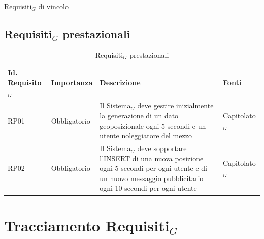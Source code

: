 \documentclass[10pt]{article}
\begin{document}
\begin{justify}
\begin{table}[H]
\caption{Requisiti$_G$ di vincolo}
\end{table}


\newpage
\subsection{Requisiti$_G$ prestazionali}

\begin{table}[H]
\centering
\renewcommand{\arraystretch}{1.5}
\begin{tabular}{|>{\centering\arraybackslash}m{2.7cm}|>{\centering\arraybackslash}m{2.7cm}|>{\centering\arraybackslash}m{6cm}|>{\centering\arraybackslash}m{2.1cm}|}
\hline
\textbf{Id. Requisito$_G$} & \textbf{Importanza} & \textbf{Descrizione} & \textbf{Fonti}\\
\hline
RP01 & Obbligatorio &  Il Sistema$_G$ deve gestire inizialmente la generazione di un dato geoposizionale ogni 5 secondi e un utente noleggiatore del mezzo & Capitolato$_G$\\
\hline
RP02 & Obbligatorio &  Il Sistema$_G$ deve sopportare l'INSERT di una nuova posizione ogni 5 secondi per ogni utente e di un nuovo messaggio pubblicitario ogni 10 secondi per ogni utente  & Capitolato$_G$\\
\hline
\end{tabular}
\caption{Requisiti$_G$ prestazionali}
\end{table}



\newpage
\section{Tracciamento Requisiti$_G$}


\end{justify}
\end{document}
